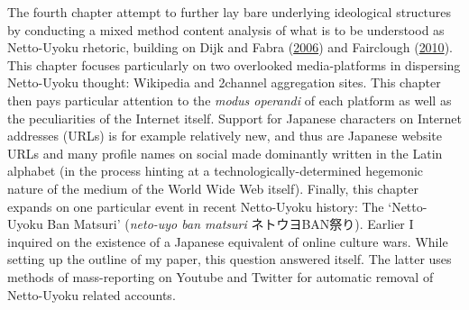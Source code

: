 \documentclass[10pt,british,A4paper,,openany]{memoir}
\begin{document}
The fourth chapter attempt to further lay bare underlying ideological
structures by conducting a mixed method content analysis of what is to
be understood as Netto-Uyoku rhetoric, building on Dijk and Fabra
(\protect\hyperlink{ref-van_dijk_politics_2006}{2006}) and Fairclough
(\protect\hyperlink{ref-fairclough_media_2010}{2010}). This chapter
focuses particularly on two overlooked media-platforms in dispersing
Netto-Uyoku thought: Wikipedia and 2channel aggregation sites. This
chapter then pays particular attention to the \emph{modus operandi} of
each platform as well as the peculiarities of the Internet itself.
Support for Japanese characters on Internet addresses (URLs) is for
example relatively new, and thus are Japanese website URLs and many
profile names on social made dominantly written in the Latin alphabet
(in the process hinting at a technologically-determined hegemonic nature
of the medium of the World Wide Web itself). Finally, this chapter
expands on one particular event in recent Netto-Uyoku history: The
`Netto-Uyoku Ban Matsuri' (\emph{neto-uyo ban matsuri} ネトウヨBAN祭り).
Earlier I inquired on the existence of a Japanese equivalent of online
culture wars. While setting up the outline of my paper, this question
answered itself. The latter uses methods of mass-reporting on Youtube
and Twitter for automatic removal of Netto-Uyoku related accounts.
\end{document}
